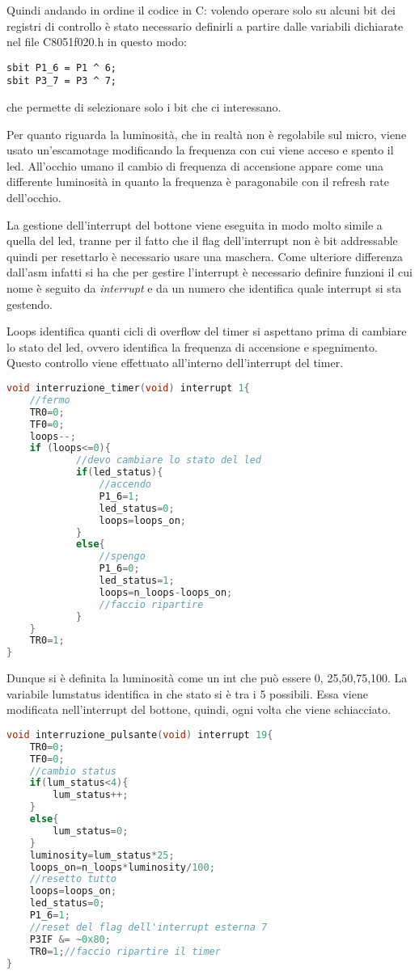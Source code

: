 \documentclass[main.tex]{subfiles}
\begin{document}
Quindi andando in ordine il codice in C: volendo operare solo su alcuni bit dei registri di controllo è stato necessario definirli a partire dalle variabili dichiarate nel file C8051f020.h in questo modo:
\begin{lstlisting}
sbit P1_6 = P1 ^ 6;
sbit P3_7 = P3 ^ 7;
\end{lstlisting}
che permette di selezionare solo i bit che ci interessano. 

Per quanto riguarda la luminosità, che in realtà non è regolabile sul micro, viene usato un'escamotage modificando la frequenza con cui viene acceso e spento il led. All'occhio umano il cambio di frequenza di accensione appare come una differente luminosità in quanto la frequenza è paragonabile con il refresh rate dell'occhio. 

La gestione dell'interrupt del bottone viene eseguita in modo molto simile a quella del led, tranne per il fatto che il flag dell'interrupt non è bit addressable quindi per resettarlo è necessario usare una maschera. 
Come ulteriore differenza dall'asm infatti si ha che per gestire l'interrupt è necessario definire funzioni il cui nome è seguito da \textit{interrupt} e da un numero che identifica quale interrupt si sta gestendo. 

 Loops identifica quanti cicli di overflow del timer si aspettano prima di cambiare lo stato del led, ovvero identifica la frequenza di accensione e spegnimento. Questo controllo viene effettuato all'interno dell'interrupt del timer.
 \begin{lstlisting}[language=C,caption=Interrupt timer]
 void interruzione_timer(void) interrupt 1{
	//fermo
	TR0=0;
	TF0=0;
	loops--;
	if (loops<=0){
	        //devo cambiare lo stato del led
			if(led_status){
				//accendo
				P1_6=1;
				led_status=0;
				loops=loops_on;
			}
			else{
				//spengo
				P1_6=0;
				led_status=1;
				loops=n_loops-loops_on;
				//faccio ripartire
			}
	}
	TR0=1;
}
 \end{lstlisting}
 
 Dunque si è definita la luminosità come un int che può essere 0, 25,50,75,100. La variabile lumstatus identifica in che stato si è tra i 5 possibili. Essa viene modificata nell'interrupt del bottone, quindi, ogni volta che viene schiacciato.
 \begin{lstlisting}[language=C, caption=Interrupt pulsante,label={lst:led in C}]
 void interruzione_pulsante(void) interrupt 19{
	TR0=0;
	TF0=0;
	//cambio status
	if(lum_status<4){
		lum_status++;
	}
	else{
		lum_status=0;
	}
	luminosity=lum_status*25;
	loops_on=n_loops*luminosity/100;
	//resetto tutto
	loops=loops_on;
	led_status=0;
	P1_6=1;
	//reset del flag dell'interrupt esterna 7
	P3IF &= ~0x80;
	TR0=1;//faccio ripartire il timer
}
 \end{lstlisting}
\end{document}
